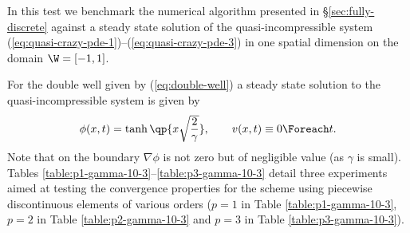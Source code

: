 \documentclass[final]{amsart}
\numberwithin{equation}{section}
\begin{document}
In this test we benchmark the numerical algorithm presented in
\S\ref{sec:fully-discrete} against a steady state solution of the
quasi-incompressible system
(\ref{eq:quasi-crazy-pde-1})--(\ref{eq:quasi-crazy-pde-3}) in one
spatial dimension on the domain $\W = [-1,1]$.

For the double well given by (\ref{eq:double-well}) a steady state
solution to the quasi-incompressible system is given by
\begin{gather}
  \phi(x,t) 
  =
  \tanh\qp{ x \sqrt{\frac{2}{\gamma}}},
  \qquad v(x,t) \equiv 0 \Foreach t.
\end{gather}
Note that on the boundary $\nabla \phi$ is not zero but of negligible
value (as $\gamma$ is small). Tables
\ref{table:p1-gamma-10-3}--\ref{table:p3-gamma-10-3} detail three
experiments aimed at testing the convergence properties for the scheme
using piecewise discontinuous elements of various orders ($p=1$ in
Table \ref{table:p1-gamma-10-3}, $p=2$ in Table
\ref{table:p2-gamma-10-3} and $p=3$ in Table
\ref{table:p3-gamma-10-3}).
\end{document}
